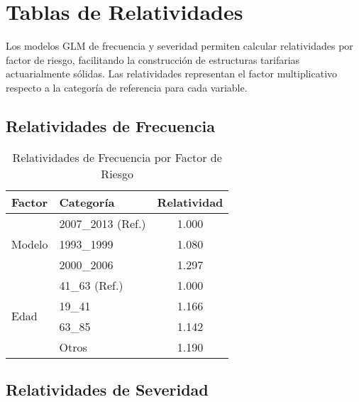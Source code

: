 \section{Tablas de Relatividades}

Los modelos GLM de frecuencia y severidad permiten calcular relatividades por factor de riesgo, facilitando la construcción de estructuras tarifarias actuarialmente sólidas. Las relatividades representan el factor multiplicativo respecto a la categoría de referencia para cada variable.

\subsection{Relatividades de Frecuencia}

\begin{table}[H]
\centering
\caption{Relatividades de Frecuencia por Factor de Riesgo}
\begin{tabular}{|l|l|c|}
\hline
\textbf{Factor} & \textbf{Categoría} & \textbf{Relatividad} \\
\hline
\multirow{3}{*}{Modelo} & 2007\_2013 (Ref.) & 1.000 \\
                        & 1993\_1999 & 1.080 \\
                        & 2000\_2006 & 1.297 \\
\hline
\multirow{4}{*}{Edad} & 41\_63 (Ref.) & 1.000 \\
                      & 19\_41 & 1.166 \\
                      & 63\_85 & 1.142 \\
                      & Otros & 1.190 \\
\hline
\end{tabular}
\end{table}

\subsection{Relatividades de Severidad}

